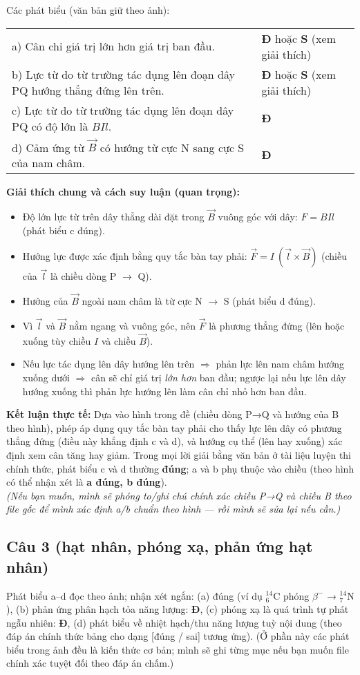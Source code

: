\documentclass[12pt,a4paper]{article}
\begin{document}
Các phát biểu (văn bản giữ theo ảnh):
\begin{tabular}{p{}l}
a) Cân chỉ giá trị lớn hơn giá trị ban đầu. & \textbf{Đ} hoặc \textbf{S} (xem giải thích) \\
b) Lực từ do từ trường tác dụng lên đoạn dây PQ hướng thẳng đứng lên trên. & \textbf{Đ} hoặc \textbf{S} (xem giải thích) \\
c) Lực từ do từ trường tác dụng lên đoạn dây PQ có độ lớn là $B I l$. & \textbf{Đ} \\
d) Cảm ứng từ $\vec B$ có hướng từ cực N sang cực S của nam châm. & \textbf{Đ}
\end{tabular}

\textbf{Giải thích chung và cách suy luận (quan trọng):}
\begin{itemize}
  \item Độ lớn lực từ trên dây thẳng dài đặt trong $ \vec B $ vuông góc với dây: $F = BIl$ (phát biểu c đúng).
  \item Hướng lực được xác định bằng quy tắc bàn tay phải: $\vec F = I\ (\vec l \times \vec B)$ (chiều của $\vec l$ là chiều dòng P $\to$ Q).
  \item Hướng của $\vec B$ ngoài nam châm là từ cực N $\to$ S (phát biểu d đúng).
  \item Vì $\vec l$ và $\vec B$ nằm ngang và vuông góc, nên $\vec F$ là phương thẳng đứng (lên hoặc xuống tùy chiều $I$ và chiều $\vec B$).
  \item Nếu lực tác dụng lên dây hướng lên trên $\Rightarrow$ phản lực lên nam châm hướng xuống dưới $\Rightarrow$ cân sẽ chỉ giá trị \emph{lớn hơn} ban đầu; ngược lại nếu lực lên dây hướng xuống thì phản lực hướng lên làm cân chỉ nhỏ hơn ban đầu.
\end{itemize}

\textbf{Kết luận thực tế:} Dựa vào hình trong đề (chiều dòng P→Q và hướng của B theo hình), phép áp dụng quy tắc bàn tay phải cho thấy lực lên dây có phương thẳng đứng (điều này khẳng định c và d), và hướng cụ thể (lên hay xuống) xác định xem cân tăng hay giảm. Trong mọi lời giải bằng văn bản ở tài liệu luyện thi chính thức, phát biểu c và d thường \textbf{đúng}; a và b phụ thuộc vào chiều (theo hình có thể nhận xét là \textbf{a đúng, b đúng}).\\
\emph{(Nếu bạn muốn, mình sẽ phóng to/ghi chú chính xác chiều P→Q và chiều B theo file gốc để mình xác định a/b \emph{chuẩn} theo hình — rồi mình sẽ sửa lại nếu cần.)}

\bigskip
\subsection*{Câu 3 (hạt nhân, phóng xạ, phản ứng hạt nhân)}
Phát biểu a--d đọc theo ảnh; nhận xét ngắn: (a) đúng (ví dụ $\mathrm{^{14}_6C}$ phóng $\beta^{-}$ → $\mathrm{^{14}_7N}$), (b) phản ứng phân hạch tỏa năng lượng: \textbf{Đ}, (c) phóng xạ là quá trình tự phát ngẫu nhiên: \textbf{Đ}, (d) phát biểu về nhiệt hạch/thu năng lượng tuỳ nội dung (theo đáp án chính thức bảng cho dạng [đúng / sai] tương ứng). (Ở phần này các phát biểu trong ảnh đều là kiến thức cơ bản; mình sẽ ghi từng mục nếu bạn muốn file chính xác tuyệt đối theo đáp án chấm.)
\end{document}
